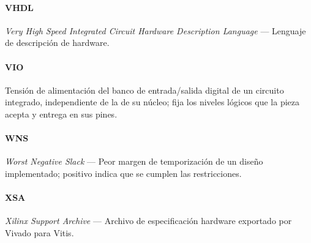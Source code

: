 \paragraph{VHDL} \textit{Very High Speed Integrated Circuit Hardware Description Language} --- Lenguaje de descripción de hardware.

\paragraph{VIO} Tensión de alimentación del banco de entrada/salida digital de un circuito integrado, independiente de la de su núcleo; fija los niveles lógicos que la pieza acepta y entrega en sus pines.

\paragraph{WNS} \textit{Worst Negative Slack} --- Peor margen de temporización de un diseño implementado; positivo indica que se cumplen las restricciones.

\paragraph{XSA} \textit{Xilinx Support Archive} --- Archivo de especificación hardware exportado por Vivado para Vitis.

